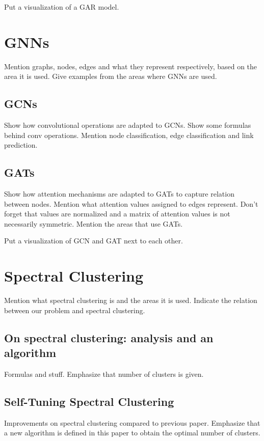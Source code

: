 \documentclass[doctype=mastersthesis,lang=english,BCOR=15mm,biblatex]{ldvbook}
\begin{document}
Put a visualization of a GAR model.

\section{GNNs}

Mention graphs, nodes, edges and what they represent respectively, based on the area it is used. Give examples from the areas where GNNs are used.

\subsection{GCNs}

Show how convolutional operations are adapted to GCNs. Show some formulas behind conv operations. Mention node classification, edge classification and link prediction.

\subsection{GATs}

Show how attention mechanisms are adapted to GATs to capture relation between nodes. Mention what attention values assigned to edges represent. Don't forget that values are normalized and a matrix of attention values is not necessarily symmetric. Mention the areas that use GATs.

Put a visualization of GCN and GAT next to each other.

\section{Spectral Clustering}

Mention what spectral clustering is and the areas it is used. Indicate the relation between our problem and spectral clustering.

\subsection{On spectral clustering: analysis and an algorithm}

Formulas and stuff. Emphasize that number of clusters is given.

\subsection{Self-Tuning Spectral Clustering}

Improvements on spectral clustering compared to previous paper. Emphasize that a new algorithm is defined in this paper to obtain the optimal number of clusters.
\end{document}
